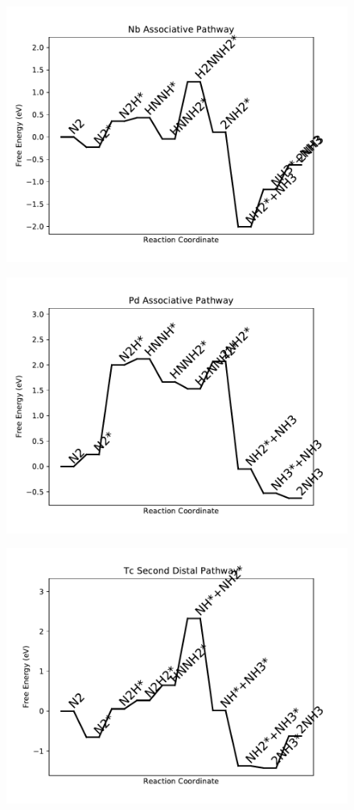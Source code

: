 \begin{figure}
\includegraphics[width=0.8\linewidth]{data/plots/Nb_associative.pdf}
\end{figure}

\begin{figure}
\includegraphics[width=0.8\linewidth]{data/plots/Pd_associative.pdf}
\end{figure}

\begin{figure}
\includegraphics[width=0.8\linewidth]{data/plots/Tc_distal_2.pdf}
\end{figure}

